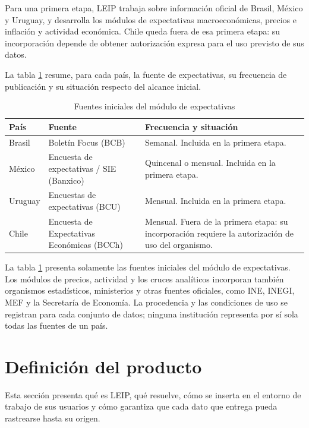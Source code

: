 \documentclass[11pt,a4paper]{article}
\newcommand{\proyectoNombre}{LEIP}
\begin{document}
Para una primera etapa, \proyectoNombre{} trabaja sobre informaci\'on oficial de
Brasil, M\'exico y Uruguay, y desarrolla los m\'odulos de expectativas
macroecon\'omicas, precios e inflaci\'on y actividad econ\'omica. Chile queda
fuera de esa primera etapa: su incorporaci\'on depende de obtener autorizaci\'on
expresa para el uso previsto de sus datos.

La tabla \ref{tab:fuentes} resume, para cada pa\'is, la fuente de expectativas,
su frecuencia de publicaci\'on y su situaci\'on respecto del alcance inicial.

\begin{table}[htbp]
\centering
\caption{Fuentes iniciales del m\'odulo de expectativas}
\label{tab:fuentes}
\begin{tabularx}{\textwidth}{l l X}
\toprule
\textbf{Pa\'is} & \textbf{Fuente} & \textbf{Frecuencia y situaci\'on} \\
\midrule
Brasil  & Bolet\'in Focus (BCB)            & Semanal. Incluida en la primera etapa. \\
M\'exico & Encuesta de expectativas / SIE (Banxico) & Quincenal o mensual. Incluida en la primera etapa. \\
Uruguay & Encuestas de expectativas (BCU)  & Mensual. Incluida en la primera etapa. \\
Chile   & Encuesta de Expectativas Econ\'omicas (BCCh) & Mensual. Fuera de la primera etapa: su incorporaci\'on requiere la autorizaci\'on de uso del organismo. \\
\bottomrule
\end{tabularx}
\end{table}

La tabla \ref{tab:fuentes} presenta solamente las fuentes iniciales del m\'odulo
de expectativas. Los m\'odulos de precios, actividad y los cruces anal\'iticos
incorporan tambi\'en organismos estad\'isticos, ministerios y otras fuentes
oficiales, como INE, INEGI, MEF y la Secretar\'ia de Econom\'ia. La procedencia
y las condiciones de uso se registran para cada conjunto de datos; ninguna
instituci\'on representa por s\'i sola todas las fuentes de un pa\'is.

\section{Definici\'on del producto}

Esta secci\'on presenta qu\'e es \proyectoNombre{}, qu\'e resuelve, c\'omo se
inserta en el entorno de trabajo de sus usuarios y c\'omo garantiza que cada
dato que entrega pueda rastrearse hasta su origen.
\end{document}
